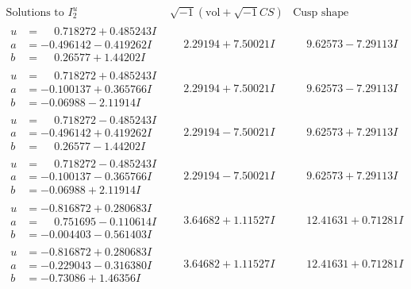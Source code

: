 \documentclass[1p]{elsarticle_modified}
\theoremstyle{definition}
\newcommand{\I}{\sqrt{-1}}
\begin{document}
$$\begin{array}{c|c|c}  
\text{Solutions to }I^u_{2}& \I (\text{vol} + \sqrt{-1}CS) & \text{Cusp shape}\\
 \hline 
\begin{aligned}
u &= \phantom{-}0.718272 + 0.485243 I \\
a &= -0.496142 - 0.419262 I \\
b &= \phantom{-}0.26577 + 1.44202 I\end{aligned}
 & \phantom{-}2.29194 + 7.50021 I & \phantom{-}9.62573 - 7.29113 I \\ \hline\begin{aligned}
u &= \phantom{-}0.718272 + 0.485243 I \\
a &= -0.100137 + 0.365766 I \\
b &= -0.06988 - 2.11914 I\end{aligned}
 & \phantom{-}2.29194 + 7.50021 I & \phantom{-}9.62573 - 7.29113 I \\ \hline\begin{aligned}
u &= \phantom{-}0.718272 - 0.485243 I \\
a &= -0.496142 + 0.419262 I \\
b &= \phantom{-}0.26577 - 1.44202 I\end{aligned}
 & \phantom{-}2.29194 - 7.50021 I & \phantom{-}9.62573 + 7.29113 I \\ \hline\begin{aligned}
u &= \phantom{-}0.718272 - 0.485243 I \\
a &= -0.100137 - 0.365766 I \\
b &= -0.06988 + 2.11914 I\end{aligned}
 & \phantom{-}2.29194 - 7.50021 I & \phantom{-}9.62573 + 7.29113 I \\ \hline\begin{aligned}
u &= -0.816872 + 0.280683 I \\
a &= \phantom{-}0.751695 - 0.110614 I \\
b &= -0.004403 - 0.561403 I\end{aligned}
 & \phantom{-}3.64682 + 1.11527 I & \phantom{-}12.41631 + 0.71281 I \\ \hline\begin{aligned}
u &= -0.816872 + 0.280683 I \\
a &= -0.229043 - 0.316380 I \\
b &= -0.73086 + 1.46356 I\end{aligned}
 & \phantom{-}3.64682 + 1.11527 I & \phantom{-}12.41631 + 0.71281 I \\ \hline\begin{aligned}

\end{aligned}
\end{array}$$
\end{document}
